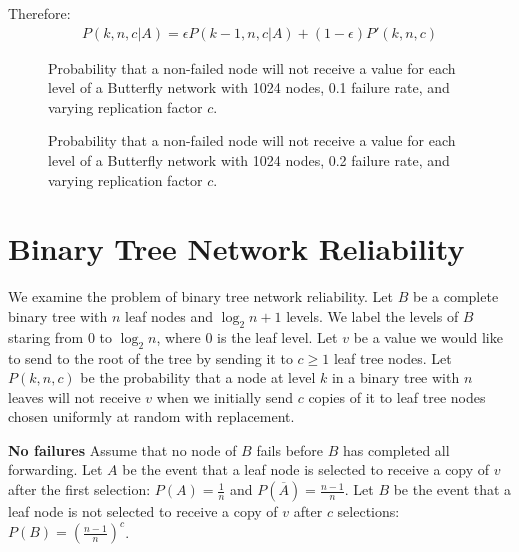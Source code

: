 \documentclass[11pt,twocolumn]{MyTightStyle}
\theoremstyle{plain}
\theoremstyle{definition}
\theoremstyle{remark}
\numberwithin{equation}{section}
\begin{document}
  \noindent Therefore:
  \begin{eqnarray*}
    P(k,n,c|A) = \epsilon P(k-1,n,c|A) + (1-\epsilon)P'(k,n,c)
  \end{eqnarray*}
   
  \begin{figure}
    \begin{center}
      \caption{\footnotesize Probability that a non-failed node will
      not receive a value for each level of a Butterfly network with
      1024 nodes, 0.1 failure rate, and varying replication factor $c$.}
      \label{test}
    \end{center}
  \end{figure}

  \begin{figure}
    \begin{center}
      \caption{\footnotesize Probability that a non-failed node will
      not receive a value for each level of a Butterfly network with
      1024 nodes, 0.2 failure rate, and varying replication factor $c$.}
      \label{test}
    \end{center}
  \end{figure}

  





\section {Binary Tree Network Reliability}

  We examine the problem of binary tree network reliability. Let $B$
  be a complete binary tree with $n$ leaf nodes and $\log_2{n}+1$
  levels. We label the levels of $B$ staring from 0 to $\log_2n$, where 0 is the leaf
  level. Let $v$ be a value we would like to send to the root of the
  tree by sending it to $c \geq 1$ leaf tree nodes. Let $P(k,n,c)$ be
  the probability that a node at level $k$ in a binary tree with $n$
  leaves will not receive $v$ when we initially send $c$ copies of it
  to leaf tree nodes chosen uniformly at random with replacement.

  {\bf No failures}
  Assume that no node of $B$ fails before $B$ has completed all
  forwarding. Let $A$ be the event that a leaf node is selected to
  receive a copy of $v$ after the first selection: $P(A) =
  \frac{1}{n}$ and $P(\overline{A}) = \frac{n-1}{n}$. Let $B$ be the
  event that a leaf node is not selected to receive a copy of $v$
  after $c$ selections: $P(B) = (\frac{n-1}{n})^c$. 
\end{document}
